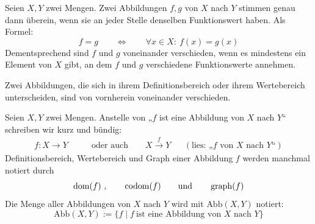 \begin{axiom} \label{abbgleich}
    Seien $X,Y$ zwei Mengen. Zwei Abbildungen $f,g$ von $X$ nach $Y$ stimmen genau dann überein, wenn sie an jeder Stelle denselben Funktionswert haben. Als Formel:
        \[ f=g \qquad\Leftrightarrow\qquad \forall x\in X:\ f(x)=g(x) \]
    Dementsprechend sind $f$ und $g$ voneinander verschieden, wenn es mindestens ein Element von $X$ gibt, an dem $f$ und $g$ verschiedene Funktionswerte annehmen.
    
    Zwei Abbildungen, die sich in ihrem Definitionsbereich oder ihrem Wertebereich unterscheiden, sind von vornherein voneinander verschieden.
\end{axiom}


\begin{nota}
    Seien $X,Y$ zwei Mengen.
    Anstelle von „$f$ ist eine Abbildung von $X$ nach $Y$“ schreiben wir kurz und bündig:
    \begin{align*}
        f:X \to Y \qquad & \text{oder auch}\qquad X\xrightarrow{f} Y && (\text{lies: „$f$ von $X$ nach $Y$“})
    \end{align*}
    Definitionsbereich, Wertebereich und Graph einer Abbildung $f$ werden manchmal notiert durch
        \[ \operatorname{dom}(f)\ , \qquad \operatorname{codom}(f) \qquad\text{und}\qquad \operatorname{graph}(f)\]
    Die Menge aller Abbildungen von $X$ nach $Y$ wird mit $\text{Abb}(X,Y)$ notiert:
        \[ \text{Abb}(X,Y) := \{ f \mid f\ \text{ist eine Abbildung von $X$ nach $Y$} \} \]
\end{nota}


